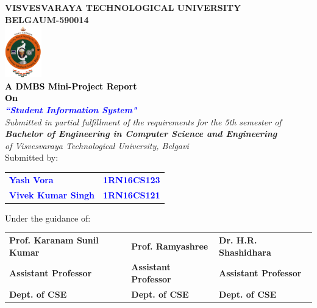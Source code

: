 
\begin{titlepage}
\begin{center}
\break\break
\textup{\large {\textcolor{darkbrown}{\bf VISVESVARAYA TECHNOLOGICAL UNIVERSITY} \\ {\textcolor{darkbrown}{\bf BELGAUM-590014}}}}\\
\includegraphics[width=0.12\textwidth]{./VTU.png}\\
\textup{\small {\textcolor{black}{\textbf {A DMBS Mini-Project Report} \\ {\textbf {On}}}}} \\
\textup{\large {\textcolor{blue}{\textbf {\textit {``Student Information System"}}}}} \\[0.2in]
\textup{{\textit {Submitted in partial fulfillment of the requirements for the 5th semester of} \\ {\textbf {\textit {Bachelor of Engineering in Computer Science and Engineering}} \\ \textit {of Visvesvaraya Technological University, Belgavi}}}}\\
\textup{Submitted by:} 
\break\break
\begin{tabular}{l  l}
\textcolor{blue}{\textbf{Yash Vora}} & \textcolor{blue}{\hspace{2.7cm}\textbf{1RN16CS123}}\\
\textcolor{blue}{\textbf{Vivek Kumar Singh}} & \textcolor{blue}{\hspace{2.7cm}\textbf{1RN16CS121}}\\
\end{tabular}
\break\break\break\break
\textup{\normalsize {\textcolor{black}{ Under the guidance of:}}}\break\break
\begin{tabular}{l  l  l}
\textbf{Prof. Karanam Sunil Kumar} & \textbf{Prof. Ramyashree} & \textbf{Dr. H.R. Shashidhara} \\
\textbf{Assistant Professor} & \textbf{Assistant Professor} & \textbf{Assistant Professor} \\
\textbf{Dept. of CSE} & \textbf{Dept. of CSE} & \textbf{Dept. of CSE}\\
\end{tabular}


\end{center}
\end{titlepage}
